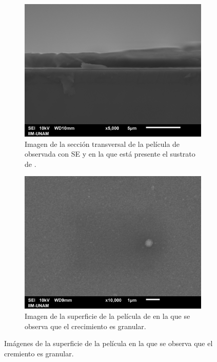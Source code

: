 \documentclass[12pt]{IEEEtran}
\begin{document}
\begin{figure}[htb]
	\centering
	\begin{subfigure}[b]{0.45\textwidth}
		\centering
		\includegraphics[width=\linewidth]{Al-transv-0008.png}
		\caption{Imagen de la sección transversal de la película de  observada con SE y en la que está presente el sustrato de .}
		\label{fig:Al-trans-sustrato}
	\end{subfigure}%
	\vspace{0.3cm}
	\begin{subfigure}[b]{0.45\textwidth}
		\centering
		\includegraphics[width=\linewidth]{Al-sup-0002.png}
		\caption{Imagen de la superficie de la película de  en la que se observa que el crecimiento es granular.}
		\label{fig:Al-sup}
	\end{subfigure}
	\caption{Imágenes de la superficie de la película en la que se observa que el cremiento es granular.}
\end{figure}
\end{document}
